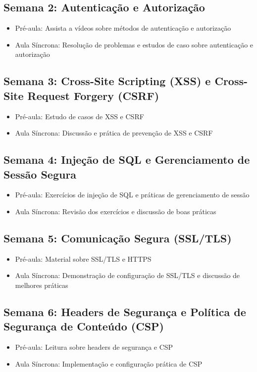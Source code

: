 \documentclass{scrartcl}
\begin{document}
\subsection{Semana 2: Autenticação e Autorização}
\label{sec:org011ad94}
\begin{itemize}
\item Pré-aula: Assista a vídeos sobre métodos de autenticação e autorização
\item Aula Síncrona: Resolução de problemas e estudos de caso sobre autenticação e autorização
\end{itemize}

\subsection{Semana 3: Cross-Site Scripting (XSS) e Cross-Site Request Forgery (CSRF)}
\label{sec:org63730c4}
\begin{itemize}
\item Pré-aula: Estudo de casos de XSS e CSRF
\item Aula Síncrona: Discussão e prática de prevenção de XSS e CSRF
\end{itemize}

\subsection{Semana 4: Injeção de SQL e Gerenciamento de Sessão Segura}
\label{sec:org55fe843}
\begin{itemize}
\item Pré-aula: Exercícios de injeção de SQL e práticas de gerenciamento de sessão
\item Aula Síncrona: Revisão dos exercícios e discussão de boas práticas
\end{itemize}

\subsection{Semana 5: Comunicação Segura (SSL/TLS)}
\label{sec:org6881048}
\begin{itemize}
\item Pré-aula: Material sobre SSL/TLS e HTTPS
\item Aula Síncrona: Demonstração de configuração de SSL/TLS e discussão de melhores práticas
\end{itemize}

\subsection{Semana 6: Headers de Segurança e Política de Segurança de Conteúdo (CSP)}
\label{sec:orgdeca7fe}
\begin{itemize}
\item Pré-aula: Leitura sobre headers de segurança e CSP
\item Aula Síncrona: Implementação e configuração prática de CSP
\end{itemize}
\end{document}
